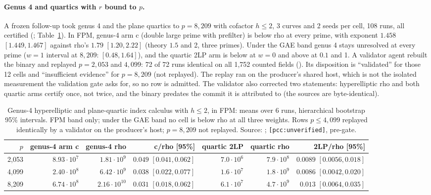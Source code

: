 \paragraph{Genus 4 and quartics with $r$ bound to $p$.} A frozen follow-up
took genus 4 and the plane quartics to $p=8{,}209$ with cofactor $h\le2$,
3 curves and 2 seeds per cell, 108 runs, all certified
(;
Table~\ref{tab:jac-ladder-r}). In FPM, genus-4 arm c (double large prime
with prefilter) is below rho at every prime, with exponent $1.458$
$[1.449,1.467]$ against rho's $1.79$ $[1.20,2.22]$ (theory $1.5$ and 2, three
primes). Under the GAE band genus 4 stays unresolved at every prime ($w=1$
interval at $8{,}209$: $[0.48,1.64]$), and the quartic 2LP arm is below at
$w=0$ and above at $0.1$ and 1. A validator agent rebuilt the binary and
replayed $p=2{,}053$ and $4{,}099$: 72 of 72 runs identical on all 1{,}752
counted fields
(). Its
disposition is ``validated'' for those 12 cells and ``insufficient
evidence'' for $p=8{,}209$ (not replayed). The replay ran on the producer's
shared host, which is not the isolated measurement the validation gate
asks for, so no row is admitted. The validator also corrected two
statements: hyperelliptic rho and both quartic arms certify once, not twice,
and the binary predates the commit it is attributed to (the sources are
byte-identical).

\begin{table}[t]
\centering\footnotesize
\begin{tabular}{@{}rrrrrrr@{}}
\toprule
$p$ & genus-4 arm c & genus-4 rho & c/rho [95\%] & quartic 2LP & quartic rho & 2LP/rho [95\%] \\
\midrule
2{,}053 & $8.93\cdot10^7$ & $1.81\cdot10^9$ & $0.049$ $[0.041,0.062]$ & $7.0\cdot10^6$ & $7.9\cdot10^8$ & $0.0089$ $[0.0056,0.018]$ \\
4{,}099 & $2.40\cdot10^8$ & $6.42\cdot10^9$ & $0.038$ $[0.022,0.077]$ & $1.6\cdot10^7$ & $1.8\cdot10^9$ & $0.0086$ $[0.0042,0.020]$ \\
8{,}209 & $6.74\cdot10^8$ & $2.16\cdot10^{10}$ & $0.031$ $[0.018,0.062]$ & $6.1\cdot10^7$ & $4.7\cdot10^9$ & $0.013$ $[0.0064,0.035]$ \\
\bottomrule
\end{tabular}
\caption[]{Genus-4 hyperelliptic and plane-quartic index calculus with
$h\le2$, in FPM: means over 6 runs, hierarchical bootstrap 95\% intervals.
FPM band only; under the GAE band no cell is below rho at all three
weights. Rows $p\le4{,}099$ replayed identically by a validator on the
producer's host; $p=8{,}209$ not replayed. Source:
;
\texttt{[pcc:unverified]}, pre-gate.}
\label{tab:jac-ladder-r}
\end{table}

